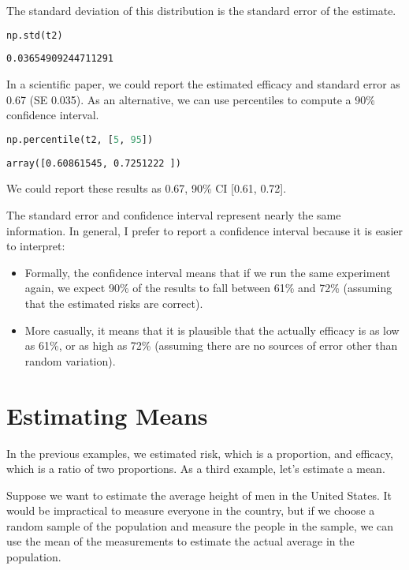 The standard deviation of this distribution is the standard error of the
estimate.

\begin{lstlisting}[language=Python,style=source]
np.std(t2)
\end{lstlisting}

\begin{lstlisting}[style=output]
0.03654909244711291
\end{lstlisting}

In a scientific paper, we could report the estimated efficacy and
standard error as 0.67 (SE 0.035). As an alternative, we can use
percentiles to compute a 90\% confidence interval.

\begin{lstlisting}[language=Python,style=source]
np.percentile(t2, [5, 95])
\end{lstlisting}

\begin{lstlisting}[style=output]
array([0.60861545, 0.7251222 ])
\end{lstlisting}

We could report these results as 0.67, 90\% CI {[}0.61, 0.72{]}.

The standard error and confidence interval represent nearly the same
information. In general, I prefer to report a confidence interval
because it is easier to interpret:

\begin{itemize}
\item
  Formally, the confidence interval means that if we run the same
  experiment again, we expect 90\% of the results to fall between 61\%
  and 72\% (assuming that the estimated risks are correct).
\item
  More casually, it means that it is plausible that the actually
  efficacy is as low as 61\%, or as high as 72\% (assuming there are no
  sources of error other than random variation).
\end{itemize}

\section{Estimating Means}\label{estimating-means}

In the previous examples, we estimated risk, which is a proportion, and
efficacy, which is a ratio of two proportions. As a third example, let's
estimate a mean.

Suppose we want to estimate the average height of men in the United
States. It would be impractical to measure everyone in the country, but
if we choose a random sample of the population and measure the people in
the sample, we can use the mean of the measurements to estimate the
actual average in the population.

